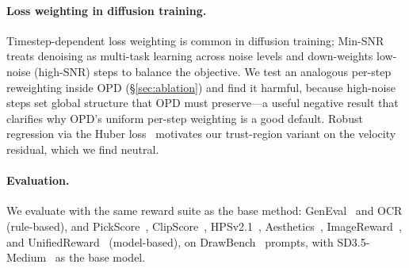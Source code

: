 \paragraph{Loss weighting in diffusion training.}
Timestep-dependent loss weighting is common in diffusion training; Min-SNR~\cite{hang2023efficient}
treats denoising as multi-task learning across noise levels and down-weights
low-noise (high-SNR) steps to balance the objective. We test an analogous
per-step reweighting inside OPD (\S\ref{sec:ablation}) and find it harmful,
because high-noise steps set global structure that OPD must preserve---a useful
negative result that clarifies why OPD's uniform per-step weighting is a good
default. Robust regression via the Huber loss~\cite{huber1964robust} motivates our
trust-region variant on the velocity residual, which we find neutral.

\paragraph{Evaluation.}
We evaluate with the same reward suite as the base method: GenEval~\cite{ghosh2023geneval}
and OCR (rule-based), and PickScore~\cite{kirstain2023pick},
ClipScore~\cite{hessel2021clipscore}, HPSv2.1~\cite{wu2023human},
Aesthetics~\cite{schuhmann2022aesthetics}, ImageReward~\cite{xu2023imagereward},
and UnifiedReward~\cite{wang2025unified} (model-based), on
DrawBench~\cite{saharia2022photorealistic} prompts, with SD3.5-Medium~\cite{esser2024scaling}
as the base model.
